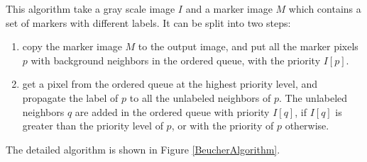 \documentclass{InsightArticle}
\begin{document}
This algorithm take a gray scale image $I$ and a marker image $M$
which contains a set of markers with different labels. It can be
split into two steps:
\begin{enumerate}
  \item copy the marker image $M$ to the output image, and put
all the marker pixels $p$ with background neighbors in the
ordered queue, with the priority $I[p]$.
  \item get a pixel from the ordered queue at the highest
priority level, and propagate the label of $p$ to all the unlabeled
neighbors of $p$. The unlabeled neighbors $q$ are added in the
ordered queue with priority $I[q]$, if $I[q]$ is greater than
the priority level of $p$, or with the priority of $p$ otherwise.
\end{enumerate}

The detailed algorithm is shown in Figure \ref{BeucherAlgorithm}.
\end{document}
